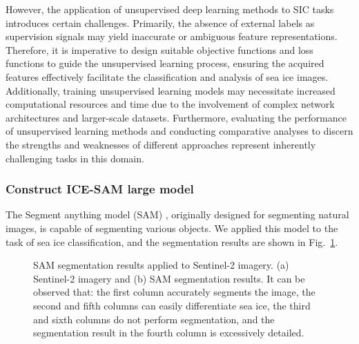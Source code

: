 However, the application of unsupervised deep learning methods to SIC tasks introduces certain challenges. Primarily, the absence of external labels as supervision signals may yield inaccurate or ambiguous feature representations. Therefore, it is imperative to design suitable objective functions and loss functions to guide the unsupervised learning process, ensuring the acquired features effectively facilitate the classification and analysis of sea ice images. Additionally, training unsupervised learning models may necessitate increased computational resources and time due to the involvement of complex network architectures and larger-scale datasets. Furthermore, evaluating the performance of unsupervised learning methods and conducting comparative analyses to discern the strengths and weaknesses of different approaches represent inherently challenging tasks in this domain.


\subsubsection{Construct ICE-SAM large model} 
The Segment anything model (SAM) \cite{149kirillov2023segment}, originally designed for segmenting natural images, is capable of segmenting various objects. We applied this model to the task of sea ice classification, and the segmentation results are shown in Fig.~\ref{SAM}.

\begin{figure*}[!tbh]
\small
   \centering
		\newcommand{\tabincell}[2]{\begin{tabular}{@{}#1@{}}#2\end{tabular}}
		\centering
\caption{SAM segmentation results applied to Sentinel-2 imagery. (a) Sentinel-2 imagery and (b) SAM segmentation results. It can be observed that: the first column accurately segments the image, the second and fifth columns can easily differentiate sea ice, the third and sixth columns do not perform segmentation, and the segmentation result in the fourth column is excessively detailed.}
\label{SAM}
\end{figure*}


